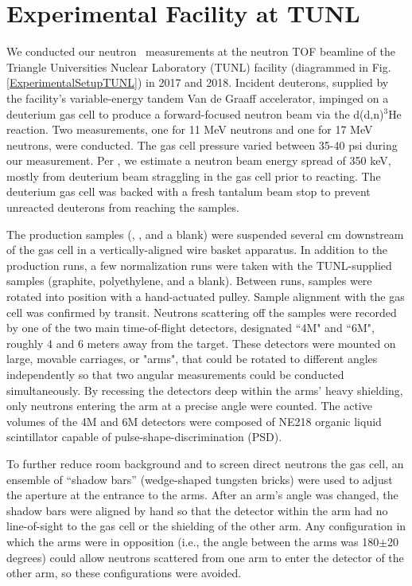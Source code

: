 \section{Experimental Facility at TUNL}
We conducted our neutron \el\ measurements at the neutron TOF
beamline of the Triangle Universities Nuclear Laboratory (TUNL) facility
(diagrammed in Fig. \ref{ExperimentalSetupTUNL}) in 2017 and 2018.
Incident deuterons, supplied by the
facility's variable-energy tandem Van de Graaff accelerator, impinged on a deuterium
gas cell to produce a forward-focused neutron beam via the d(d,n)$^{3}$He reaction.
Two measurements, one for 11 MeV neutrons and one for 17 MeV neutrons, were
conducted. The gas cell pressure varied between 35-40 psi during our
measurement. Per \cite{GussPhDThesis}, we estimate a neutron beam energy spread of
350 keV, mostly from deuterium beam straggling in the gas cell prior to reacting.
The deuterium gas cell
was backed with a fresh tantalum beam stop to prevent unreacted deuterons from
reaching the samples. 

The production samples (\snTwelve, \snFour, and a blank) were suspended several
cm downstream of the gas cell in a vertically-aligned wire basket apparatus.
In addition to the production runs, a few normalization runs were taken
with the TUNL-supplied samples (graphite, polyethylene, and a blank).
Between runs, samples were rotated into position
with a hand-actuated pulley. Sample alignment with the gas cell was confirmed
by transit. Neutrons scattering off the samples were recorded by one
of the two main time-of-flight
detectors, designated ``4M" and ``6M", roughly 4 and 6 meters away from the target.
These detectors were mounted on large, movable carriages, or "arms",
that could be rotated to different angles independently so that two angular
measurements could be conducted simultaneously. By recessing the detectors deep within
the arms' heavy shielding, only neutrons entering the arm at a precise angle
were counted. The active volumes of the 4M and 6M detectors were composed of
NE218 organic liquid scintillator capable of pulse-shape-discrimination (PSD).

To further reduce room background and to screen direct neutrons the gas cell,
an ensemble of ``shadow bars'' (wedge-shaped tungsten bricks)
were used to adjust the aperture at the entrance to the arms. After an arm's
angle was changed, the shadow bars were aligned by hand so that the
detector within the arm had no line-of-sight to the gas cell or the
shielding of the other arm. Any configuration in which the arms were in opposition (i.e., the
angle between the arms was 180$\pm$20 degrees) could allow neutrons scattered
from one arm to enter the detector of the other arm, so these configurations were avoided.

